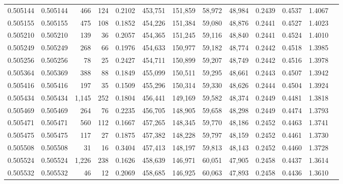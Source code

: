 \begin{tabular}{rrrrrrrrrrrrr}
0.505144 & 0.505144 &   466 &   124 &                                     0.2102 & 453,751 & 151,859 &  58,972 &  48,984 & 0.2439 & 0.4537 & 1.4067 \\
0.505155 & 0.505155 &   475 &   108 &                                     0.1852 & 454,226 & 151,384 &  59,080 &  48,876 & 0.2441 & 0.4527 & 1.4023 \\
0.505210 & 0.505210 &   139 &    36 &                                     0.2057 & 454,365 & 151,245 &  59,116 &  48,840 & 0.2441 & 0.4524 & 1.4010 \\
0.505249 & 0.505249 &   268 &    66 &                                     0.1976 & 454,633 & 150,977 &  59,182 &  48,774 & 0.2442 & 0.4518 & 1.3985 \\
0.505256 & 0.505256 &    78 &    25 &                                     0.2427 & 454,711 & 150,899 &  59,207 &  48,749 & 0.2442 & 0.4516 & 1.3978 \\
0.505364 & 0.505369 &   388 &    88 &                                     0.1849 & 455,099 & 150,511 &  59,295 &  48,661 & 0.2443 & 0.4507 & 1.3942 \\
0.505416 & 0.505416 &   197 &    35 &                                     0.1509 & 455,296 & 150,314 &  59,330 &  48,626 & 0.2444 & 0.4504 & 1.3924 \\
0.505434 & 0.505434 & 1,145 &   252 &                                     0.1804 & 456,441 & 149,169 &  59,582 &  48,374 & 0.2449 & 0.4481 & 1.3818 \\
0.505469 & 0.505469 &   264 &    76 &                                     0.2235 & 456,705 & 148,905 &  59,658 &  48,298 & 0.2449 & 0.4474 & 1.3793 \\
0.505471 & 0.505471 &   560 &   112 &                                     0.1667 & 457,265 & 148,345 &  59,770 &  48,186 & 0.2452 & 0.4463 & 1.3741 \\
0.505475 & 0.505475 &   117 &    27 &                                     0.1875 & 457,382 & 148,228 &  59,797 &  48,159 & 0.2452 & 0.4461 & 1.3730 \\
0.505508 & 0.505508 &    31 &    16 &                                     0.3404 & 457,413 & 148,197 &  59,813 &  48,143 & 0.2452 & 0.4460 & 1.3728 \\
0.505524 & 0.505524 & 1,226 &   238 &                                     0.1626 & 458,639 & 146,971 &  60,051 &  47,905 & 0.2458 & 0.4437 & 1.3614 \\
0.505532 & 0.505532 &    46 &    12 &                                     0.2069 & 458,685 & 146,925 &  60,063 &  47,893 & 0.2458 & 0.4436 & 1.3610 \\

\end{tabular}
